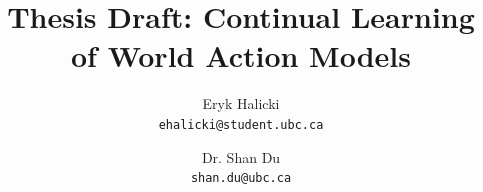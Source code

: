 \documentclass[11pt]{article}
\title{Thesis Draft: Continual Learning of World Action Models }
\author{Eryk Halicki \\ \texttt{ehalicki@student.ubc.ca} \and Dr. Shan Du \\ \texttt{shan.du@ubc.ca}}
\begin{document}
\maketitle

\abstract{}






\end{document}
